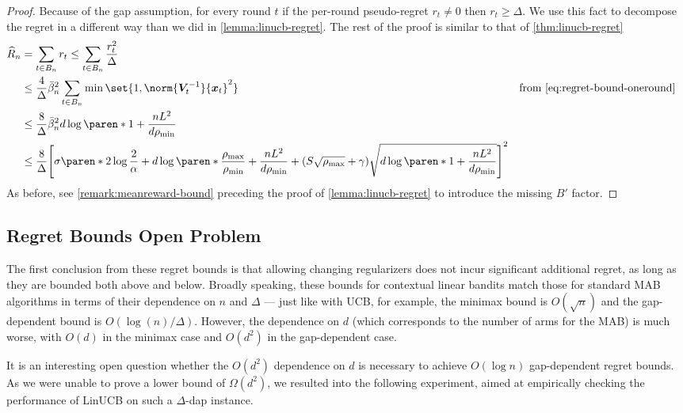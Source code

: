 \documentclass{article}
\renewcommand{\vec}[1]{\bm{#1}}
\newcommand{\inv}[1]{#1^{-1}}
\DeclarePairedDelimiter{\paren}()
\DeclarePairedDelimiter{\brck}{[}{]}
\begin{document}
\begin{proof}
  Because of the gap assumption, for every round $t$ if the per-round
  pseudo-regret $r_t \neq 0$ then $r_t \ge \Delta$.  We use this fact
  to decompose the regret in a different way than we did in
  \cref{lemma:linucb-regret}.  The rest of the proof is similar to
  that of \cref{thm:linucb-regret}
  \begin{align*}
    \widehat R_n
    &= \sum_{t\in B_n} r_t \le \sum_{t\in B_n} \frac{r_t^2}{\Delta} \\
    &\le \frac{4}{\Delta} \bar\beta_n^2 \sum_{t\in B_n} \min\set{1, \norm{\inv{\vec V_t}}{\vec x_t}^2}
    &\text{from~\eqref{eq:regret-bound-oneround}} \\
    &\le \frac{8}{\Delta} \bar\beta_n^2d\log\paren*{1+\frac{nL^2}{d\rho_{\min}}} \\
    &\le \frac{8}{\Delta} \brck*{\sigma\paren*{2\log\frac{2}{\alpha}
      + d\log\paren*{\frac{\rho_{\max}}{\rho_{\min}} + \frac{nL^2}{d\rho_{\min}}}}
      + (S\sqrt{\rho_{\max}}+\gamma)\sqrt{d\log\paren*{1+\frac{nL^2}{d\rho_{\min}}}}}^2
    &&\qedhere
  \end{align*}
  As before, see \cref{remark:meanreward-bound} preceding
  the proof of \cref{lemma:linucb-regret} to introduce
  the missing $B'$ factor.
\end{proof}

\subsection{Regret Bounds Open Problem}
\label{sec:regret-discussion}

The first conclusion from these regret bounds is that allowing
changing regularizers does not incur significant additional regret, as
long as they are bounded both above and below.  Broadly speaking,
these bounds for contextual linear bandits match those for standard
MAB algorithms in terms of their dependence on $n$ and $\Delta$ ---
just like with UCB, for example, the minimax bound is $O(\sqrt n)$ and
the gap-dependent bound is $O(\log(n)/\Delta)$.  However, the
dependence on $d$ (which corresponds to the number of arms for the
MAB) is much worse, with $O(d)$ in the minimax case and $O(d^2)$ in
the gap-dependent case.

It is an interesting open question whether the $O(d^2)$ dependence on
$d$ is necessary to achieve $O(\log n)$ gap-dependent regret bounds.
As we were unable to prove a lower bound of $\Omega(d^2)$, we resulted into the following experiment, aimed at empirically checking the performance of LinUCB on such a $\Delta$-dap instance.
\end{document}

